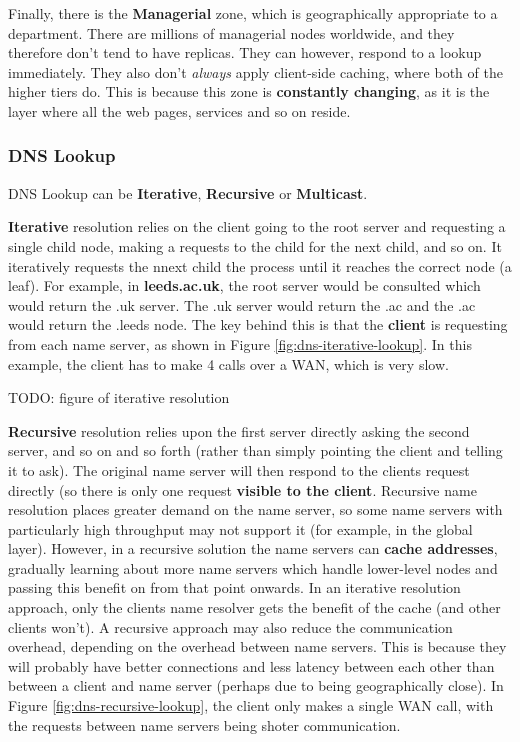 \documentclass{article}
\begin{document}
Finally, there is the \textbf{Managerial} zone, which is geographically appropriate to a department. There are millions of managerial nodes worldwide, and they therefore don't tend to have replicas. They can however, respond to a lookup immediately. They also don't \textit{always} apply client-side caching, where both of the higher tiers do. This is because this zone is \textbf{constantly changing}, as it is the layer where all the web pages, services and so on reside.

\subsubsection{DNS Lookup}
\label{sec:dns-lookup}

DNS Lookup can be \textbf{Iterative}, \textbf{Recursive} or \textbf{Multicast}.

\textbf{Iterative} resolution relies on the client going to the root server and requesting a single child node, making a requests to the child for the next child, and so on. It iteratively requests the nnext child the process until it reaches the correct node (a leaf). For example, in \textbf{leeds.ac.uk}, the root server would be consulted which would return the .uk server. The .uk server would return the .ac and the .ac would return the .leeds node. The key behind this is that the \textbf{client} is requesting from each name server, as shown in Figure \ref{fig:dns-iterative-lookup}. In this example, the client has to make 4 calls over a WAN, which is very slow.

TODO: figure of iterative resolution

\textbf{Recursive} resolution relies upon the first server directly asking the second server, and so on and so forth (rather than simply pointing the client and telling it to ask). The original name server will then respond to the clients request directly (so there is only one request \textbf{visible to the client}. Recursive name resolution places greater demand on the name server, so some name servers with particularly high throughput may not support it (for example, in the global layer). However, in a recursive solution the name servers can \textbf{cache addresses}, gradually learning about more name servers which handle lower-level nodes and passing this benefit on from that point onwards. In an iterative resolution approach, only the clients name resolver gets the benefit of the cache (and other clients won't). A recursive approach may also reduce the communication overhead, depending on the overhead between name servers. This is because they will probably have better connections and less latency between each other than between a client and name server (perhaps due to being geographically close). In Figure \ref{fig:dns-recursive-lookup}, the client only makes a single  WAN call, with the requests between name servers being shoter communication.
\end{document}
